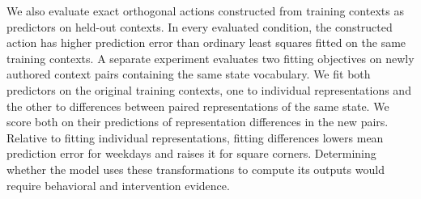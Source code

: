 We also evaluate exact orthogonal actions constructed from training contexts as predictors on held-out contexts.
In every evaluated condition, the constructed action has higher prediction error than ordinary least squares fitted on the same training contexts.
A separate experiment evaluates two fitting objectives on newly authored context pairs containing the same state vocabulary.
We fit both predictors on the original training contexts, one to individual representations and the other to differences between paired representations of the same state.
We score both on their predictions of representation differences in the new pairs.
Relative to fitting individual representations, fitting differences lowers mean prediction error for weekdays and raises it for square corners.
Determining whether the model uses these transformations to compute its outputs would require behavioral and intervention evidence.

\FloatBarrier
